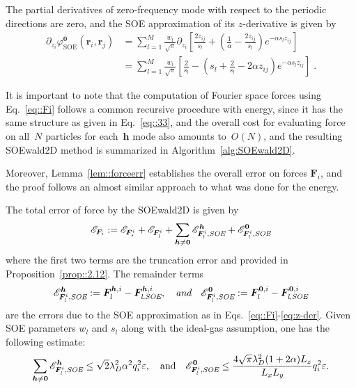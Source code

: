 The partial derivatives of zero-frequency mode with respect to the periodic directions are zero, and the SOE approximation of its $z$-derivative is given by
\begin{equation}\label{eq:dzphi_0}
	\begin{split}
		\partial_{z_{i}} \varphi^{\bm{0}}_{\text{SOE}}(\bm{r}_{i},\bm{r}_{j}) 
		& = \sum_{l=1}^{M} \frac{w_l}{\sqrt{\pi}} \partial_{z_{i}} \left[\frac{2z_{ij}}{s_l}+\left(\frac{1}{\alpha} - \frac{2z_{ij}}{s_l}\right)e^{-\alpha s_l z_{ij}}\right] \\
		& = \sum_{l=1}^{M} \frac{w_l}{\sqrt{\pi}} \left[ \frac{2}{s_l} - \left( s_l + \frac{2}{s_l} - 2 \alpha z_{ij} \right) e^{-\alpha s_l z_{ij}} \right]\;.
	\end{split}
\end{equation}

It is important to note that the computation of Fourier space forces using Eq.~\eqref{eq::Fi} follows a common recursive procedure with energy, since it has the same structure as given in Eq.~\eqref{eq::33}, and the overall cost for evaluating force on all~$N$ particles for each~$\bm{h}$ mode also amounts to~$O(N)$, and the resulting SOEwald2D method is summarized in Algorithm~\ref{alg:SOEwald2D}.

Moreover, Lemma~\ref{lem::forceerr} establishes the overall error on forces $\bm{F}_{i}$, and the proof follows an almost similar approach to what was done for the energy. %

\begin{lem}\label{lem::forceerr}
	The total error of force by the SOEwald2D is given by
	\begin{equation}
		\mathscr{E}_{\bm{F}_{i}} := \mathscr{E}_{\bm{F}_{\emph{s}}^{i}} + \mathscr{E}_{\bm{F}_{\emph{l}}^{i}} + \sum_{\bm{h}\neq \bm{0}} \mathscr{E}_{\bm{F}_{\emph{l}}^i, \emph{SOE}}^{\bm{h}} + \mathscr{E}_{\bm{F}_{\emph{l}}^{i},\emph{SOE}}^{\bm{0}}
	\end{equation}
	where the first two terms are the truncation error and provided in Proposition~\ref{prop::2.12}. The remainder terms 
	\begin{equation}
		\mathscr{E}_{\bm{F}_{\emph{l}}^i,\emph{SOE}}^{\bm{h}} := \bm{F}_{\emph{l}}^{\bm{h}, i} - \bm{F}_{\emph{l},\emph{SOE}}^{\bm{h}, i}, \quad\emph{and} \quad \mathscr{E}_{\bm{F}_{\emph{l}}^{i}, \emph{SOE}}^{\bm{0}} := \bm{F}_{\emph{l}}^{\bm{0}, i}-\bm{F}_{\emph{l}, \emph{SOE}}^{\bm{0}, i}
	\end{equation}
	are the errors due to the SOE approximation as in Eqs.~\eqref{eq::Fi}-\eqref{eq:z-der}. Given SOE parameters $w_l$ and $s_l$ along with the ideal-gas assumption, one has the following estimate:
	\begin{equation}
		\sum_{\bm{h}\neq\bm{0}} \mathscr{E}_{\bm{F}_{\emph{l}}^i, \emph{SOE}}^{ \bm{h}}\leq \sqrt{2}\lambda_D^2\alpha^2q_{i}^2\varepsilon,\quad\text{and}\quad \mathscr{E}_{\bm{F}_{\emph{l}}^{i},\emph{SOE}}^{\bm{0}}\leq \frac{4\sqrt{\pi}\lambda_D^2 (1+2\alpha)L_z}{L_xL_y}q_{i}^2\varepsilon.
	\end{equation}
\end{lem}



